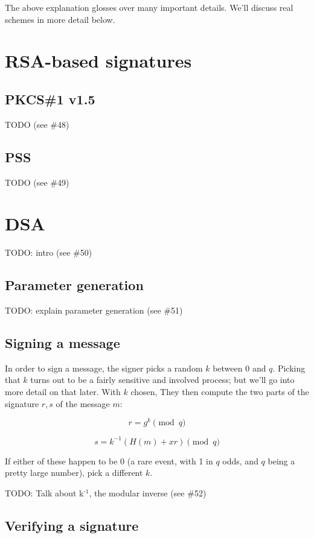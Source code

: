 \documentclass[11pt,ebook,table,dvipsnames]{memoir}
\begin{document}
The above explanation glosses over many important details. We'll
discuss real schemes in more detail below.

\section{RSA-based signatures}
\label{sec-2-8-2}
\subsection{PKCS\#1 v1.5}
\label{sec-2-8-2-1}

TODO (see \#48)
\subsection{PSS}
\label{sec-2-8-2-2}

TODO (see \#49)
\section{DSA}
\label{sec-2-8-3}

TODO: intro (see \#50)

\subsection{Parameter generation}
\label{sec-2-8-3-1}

TODO: explain parameter generation (see \#51)
\subsection{Signing a message}
\label{sec-2-8-3-2}

In order to sign a message, the signer picks a random $k$ between 0
and $q$. Picking that $k$ turns out to be a fairly sensitive and
involved process; but we'll go into more detail on that later. With
$k$ chosen, They then compute the two parts of the signature $r, s$
of the message $m$:

\[
r = g^k \pmod q
\]

\[
s = k^{-1} (H(m) + xr) \pmod q
\]

If either of these happen to be 0 (a rare event, with 1 in $q$ odds,
and $q$ being a pretty large number), pick a different $k$.

TODO: Talk about k$^{\text{-1}}$, the modular inverse (see \#52)
\subsection{Verifying a signature}
\label{sec-2-8-3-3}
\end{document}
